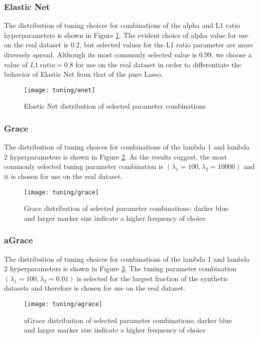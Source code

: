 \pagebreak

\subsubsection{Elastic Net}
The distribution of tuning choices for combinations of the alpha and L1 ratio hyperparameters is shown in Figure \ref{fig:tun_enet}. The evident choice of alpha value for use on the real dataset is 0.2, but selected values for the L1 ratio parameter are more diversely spread. Although its most commonly selected value is 0.99, we choose a value of $L1\ ratio = 0.8$ for use on the real dataset in order to differentiate the behavior of Elastic Net from that of the pure Lasso.
\begin{figure}[H]
	\centering
	\texttt{[image: tuning/enet]}
	\caption{Elastic Net distribution of selected parameter combinations}
	\label{fig:tun_enet}
\end{figure}

\pagebreak

\subsubsection{Grace}
The distribution of tuning choices for combinations of the lambda 1 and lambda 2 hyperparameters is shown in Figure \ref{fig:tun_grace}. As the results suggest, the most commonly selected tuning parameter combination is $(\lambda_1=100,\lambda_2=10000)$ and it is chosen for use on the real dataset.
\begin{figure}[H]
	\centering
	\texttt{[image: tuning/grace]}
	\caption{Grace distribution of selected parameter combinations; darker blue and larger marker size indicate a higher frequency of choice}
	\label{fig:tun_grace}
\end{figure}

\pagebreak

\subsubsection{aGrace}
The distribution of tuning choices for combinations of the lambda 1 and lambda 2 hyperparameters is shown in Figure \ref{fig:tun_agrace}. The tuning parameter combination $(\lambda_1=100,\lambda_2=0.01)$ is selected for the largest fraction of the synthetic datasets and therefore is chosen for use on the real dataset.
\begin{figure}[H]
	\centering
	\texttt{[image: tuning/agrace]}
	\caption{aGrace distribution of selected parameter combinations; darker blue and larger marker size indicate a higher frequency of choice}
	\label{fig:tun_agrace}
\end{figure}

